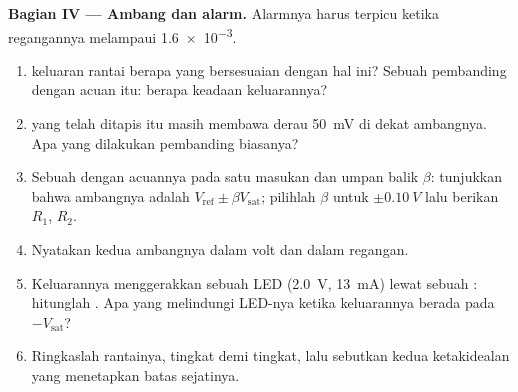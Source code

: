 \begin{problem}
\medskip
\noindent\textbf{Bagian IV --- Ambang dan alarm.}
Alarmnya harus terpicu ketika regangannya melampaui \num{1.6e-3}.
\begin{enumerate}[resume]
  \item {} keluaran rantai berapa yang bersesuaian dengan hal ini?
        Sebuah pembanding dengan acuan itu: berapa keadaan keluarannya?
  \item {} yang telah ditapis itu masih membawa derau \qty{50}{mV}
        di dekat ambangnya. Apa yang dilakukan pembanding biasanya?
  \item Sebuah  dengan acuannya pada satu masukan dan
        umpan balik $\beta$: tunjukkan bahwa ambangnya adalah
        $V_{\mathrm{ref}} \pm
        \beta V_{\mathrm{sat}}$; pilihlah $\beta$ untuk $\pm\qty{0.10}{V}$
        lalu berikan $R_1$, $R_2$.
  \item Nyatakan kedua ambangnya dalam volt dan dalam regangan.
  \item Keluarannya menggerakkan sebuah LED (\qty{2.0}{V}, \qty{13}{mA})
        lewat sebuah : hitunglah . Apa yang
        melindungi LED-nya ketika keluarannya berada pada $-V_{\mathrm{sat}}$?
  \item Ringkaslah rantainya, tingkat demi tingkat, lalu sebutkan kedua
        ketakidealan yang menetapkan batas sejatinya.
\end{enumerate}
\end{problem}
